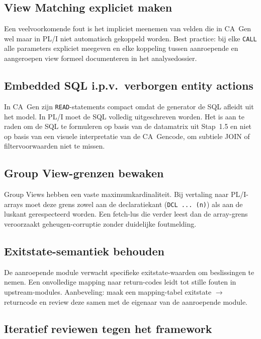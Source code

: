 \subsection{View Matching expliciet maken}
\label{subsec:view-matching-bp}

Een veelvoorkomende fout is het impliciet meenemen van velden die in CA~Gen wel maar in PL/I niet 
automatisch gekoppeld worden. Best practice: bij elke \texttt{CALL} alle parameters expliciet meegeven en 
elke koppeling tussen aanroepende en aangeroepen view formeel documenteren in het analysedossier.

\subsection{Embedded SQL i.p.v.\ verborgen entity actions}
\label{subsec:sql-bp}

In CA~Gen zijn \texttt{READ}-statements compact omdat de generator de SQL afleidt uit het model. In PL/I 
moet de SQL volledig uitgeschreven worden. Het is aan te raden om de SQL te formuleren op basis van de 
datamatrix uit Stap~1.5 en niet op basis van een visuele interpretatie van de CA~Gen\-code, om subtiele 
JOIN\- of filtervoorwaarden niet te missen.

\subsection{Group View-grenzen bewaken}
\label{subsec:groupview-bp}

Group Views hebben een vaste maximumkardinaliteit. Bij vertaling naar PL/I-arrays moet deze grens zowel 
aan de declaratiekant (\texttt{DCL ... (n)}) als aan de luskant gerespecteerd worden. Een fetch-lus die 
verder leest dan de array-grens veroorzaakt geheugen-corruptie zonder duidelijke foutmelding.

\subsection{Exitstate-semantiek behouden}
\label{subsec:exitstate-bp}

De aanroepende module verwacht specifieke exitstate-waarden om beslissingen te nemen. Een onvolledige 
mapping naar return-codes leidt tot stille fouten in upstream-modules. Aanbeveling: maak een mapping-tabel 
exitstate $\rightarrow$ return\-code en review deze samen met de eigenaar van de aanroepende module.

\subsection{Iteratief reviewen tegen het framework}
\label{subsec:iteratief-bp}

